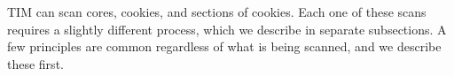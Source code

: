 \documentclass[a4paper,12pt]{article}
\begin{document}
TIM can scan cores, cookies, and sections of cookies. Each one of these scans requires a slightly different process, which we describe in separate subsections.
A few principles are common regardless of what is being scanned, and we describe these first. 



\end{document}
